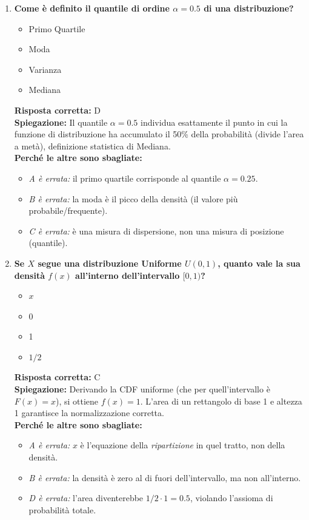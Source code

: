 \documentclass[12pt, a4paper]{article}
\begin{document}
\begin{enumerate}[label=\textbf{\arabic*.}]
    \item \textbf{Come è definito il quantile di ordine $\alpha = 0.5$ di una distribuzione?}
    \begin{itemize}
        \item[A)] Primo Quartile
        \item[B)] Moda
        \item[C)] Varianza
        \item[D)] Mediana
    \end{itemize}
    \textbf{Risposta corretta:} D \\
    \textbf{Spiegazione:} Il quantile $\alpha = 0.5$ individua esattamente il punto in cui la funzione di distribuzione ha accumulato il 50\% della probabilità (divide l'area a metà), definizione statistica di Mediana. \\
    \textbf{Perché le altre sono sbagliate:}
    \begin{itemize}
        \item \textit{A è errata:} il primo quartile corrisponde al quantile $\alpha = 0.25$.
        \item \textit{B è errata:} la moda è il picco della densità (il valore più probabile/frequente).
        \item \textit{C è errata:} è una misura di dispersione, non una misura di posizione (quantile).
    \end{itemize}

    \item \textbf{Se $X$ segue una distribuzione Uniforme $U(0,1)$, quanto vale la sua densità $f(x)$ all'interno dell'intervallo $[0,1)$?}
    \begin{itemize}
        \item[A)] $x$
        \item[B)] 0
        \item[C)] 1
        \item[D)] $1/2$
    \end{itemize}
    \textbf{Risposta corretta:} C \\
    \textbf{Spiegazione:} Derivando la CDF uniforme (che per quell'intervallo è $F(x)=x$), si ottiene $f(x) = 1$. L'area di un rettangolo di base 1 e altezza 1 garantisce la normalizzazione corretta. \\
    \textbf{Perché le altre sono sbagliate:}
    \begin{itemize}
        \item \textit{A è errata:} $x$ è l'equazione della \textit{ripartizione} in quel tratto, non della densità.
        \item \textit{B è errata:} la densità è zero al di fuori dell'intervallo, ma non all'interno.
        \item \textit{D è errata:} l'area diventerebbe $1/2 \cdot 1 = 0.5$, violando l'assioma di probabilità totale.
    \end{itemize}
\end{enumerate}
\end{document}
